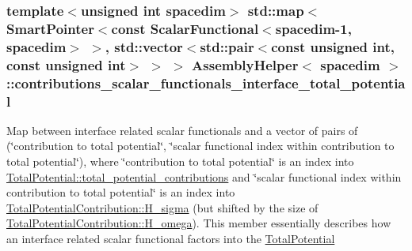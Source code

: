 \subsubsection[{\texorpdfstring{contributions\+\_\+scalar\+\_\+functionals\+\_\+interface\+\_\+total\+\_\+potential}{contributions_scalar_functionals_interface_total_potential}}]{\setlength{\rightskip}{0pt plus 5cm}template$<$unsigned int spacedim$>$ std\+::map$<${\bf Smart\+Pointer}$<$const {\bf Scalar\+Functional}$<$spacedim-\/1, spacedim$>$ $>$, std\+::vector$<$std\+::pair$<$const unsigned int, const unsigned int$>$ $>$ $>$ {\bf Assembly\+Helper}$<$ spacedim $>$\+::contributions\+\_\+scalar\+\_\+functionals\+\_\+interface\+\_\+total\+\_\+potential\hspace{0.3cm}{\ttfamily [private]}}\hypertarget{class_assembly_helper_a9e76874224ab4946218fdce9bdba0e03}{}\label{class_assembly_helper_a9e76874224ab4946218fdce9bdba0e03}
Map between interface related scalar functionals and a vector of pairs of (\char`\"{}contribution to total potential\char`\"{}, \char`\"{}scalar functional index within contribution to total potential\char`\"{}), where \char`\"{}contribution to total potential\char`\"{} is an index into \hyperlink{class_total_potential_a5a14ce0e2fabf8116566aa67fb11db35}{Total\+Potential\+::total\+\_\+potential\+\_\+contributions} and \char`\"{}scalar functional index within contribution to total potential\char`\"{} is an index into \hyperlink{class_total_potential_contribution_aac404e3a8493d9170541e34bd96673d3}{Total\+Potential\+Contribution\+::\+H\+\_\+sigma} (but shifted by the size of \hyperlink{class_total_potential_contribution_a15191539345978a3d0c7293bd7ecaa91}{Total\+Potential\+Contribution\+::\+H\+\_\+omega}). This member essentially describes how an interface related scalar functional factors into the \hyperlink{class_total_potential}{Total\+Potential} 
